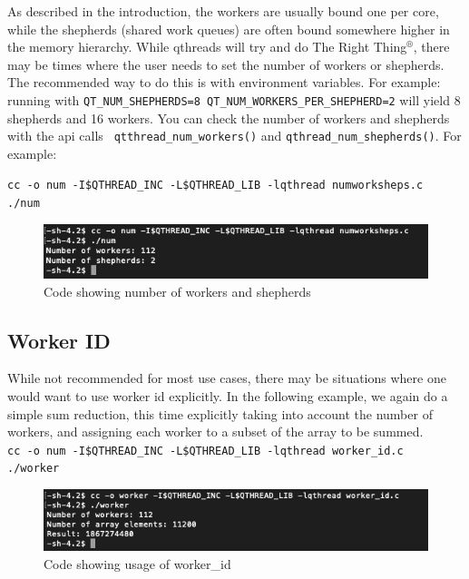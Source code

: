 \documentclass[12pt,fullpage]{article}
\begin{document}
As described in the introduction, the workers are usually bound one per core,
while the shepherds (shared work queues) are often bound somewhere higher in the
memory hierarchy. While qthreads will try and do The Right Thing$^{\circledR}$,
there may be times where the user needs to set the number of workers or
shepherds. The recommended way to do this is with environment variables. For
example: running with {\tt QT\_NUM\_SHEPHERDS=8
QT\_NUM\_WORKERS\_PER\_SHEPHERD=2} will yield 8 shepherds and 16 workers. You
can check the number of workers and shepherds with the api calls {\tt
qtthread\_num\_workers()} and {\tt qthread\_num\_shepherds()}. For example:


{\footnotesize{\tt cc -o num -I\$QTHREAD\_INC -L\$QTHREAD\_LIB -lqthread numworksheps.c}}
\\
{\footnotesize{\tt ./num}}
\begin{figure}[h]
\includegraphics[scale=0.9]{num.png}
\caption{Code showing number of workers and shepherds}
\end{figure}

\subsection{Worker ID}

While not recommended for most use cases, there may be situations where one
would want to use worker id explicitly. In the following example, we again do a
simple sum reduction, this time explicitly taking into account the number of
workers, and assigning each worker to a subset of the array to be summed.
\\
{\footnotesize{\tt cc -o num -I\$QTHREAD\_INC -L\$QTHREAD\_LIB -lqthread worker\_id.c}}
\\
{\footnotesize{\tt ./worker}}
\begin{figure}[h]
\includegraphics[scale=0.88]{worker.png}
\caption{Code showing usage of worker\_id}
\end{figure}
\newpage

\end{document}
